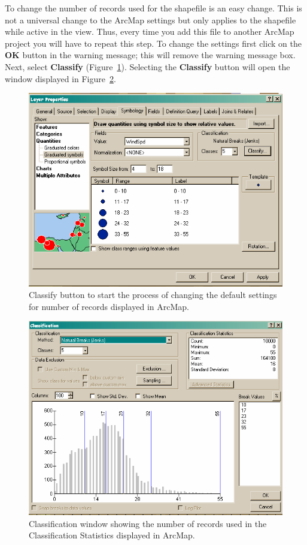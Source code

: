 \documentclass[12pt]{article}
\begin{document}
\pagebreak

To change the number of records used for the shapefile is an easy change. This is not a universal change to the
ArcMap settings but only applies to the shapefile while active in the view. Thus, every time you add this file
to another ArcMap project you will have to repeat this step. To change the settings first click on the \textbf{OK}
button in the warning message; this will remove the warning message box. Next, select \textbf{Classify} (Figure~\ref{fig:Figure16}).
Selecting the \textbf{Classify} button will open the window displayed in Figure~\ref{fig:Figure17}.

\begin{figure}[H]
	\centering
	\includegraphics[scale=0.7]{arc_16.png}
	\caption{Classify button to start the process of changing the default settings for number of records displayed in
ArcMap.}
\label{fig:Figure16}
\end{figure}

\begin{figure}[H]
	\centering
	\includegraphics[scale=0.7]{arc_17.png}
	\caption{Classification window showing the number of records used in the Classification Statistics displayed in
ArcMap.}
\label{fig:Figure17}
\end{figure}
\end{document}
